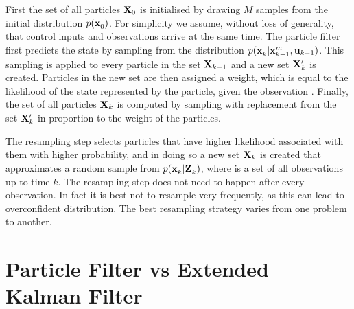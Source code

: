 First the set of all particles ${\bf X}_0$ is initialised by drawing
$M$ samples from the initial distribution $p(\x{0}{}{})$. For
simplicity we assume, without loss of generality, that control
inputs and observations arrive at the same time. The particle filter
first predicts the state by sampling from the distribution
$p(\x{k}{}{} | \x{k-1}{}{m}, \U{k-1})$. This sampling is applied to
every particle in the set ${\bf X}_{k-1}$ and a new set ${\bf
X}_k^\prime$ is created. Particles in the new set are then assigned a
weight, which is equal to the likelihood of the state represented by
the particle, given the observation . Finally, the set of all
particles ${\bf X}_k$ is computed by sampling with replacement from
the set ${\bf X}_k^\prime$ in proportion to the weight of the
particles.

The resampling step selects particles that have higher likelihood
associated with them with higher probability, and in doing so a new
set ${\bf X}_k$ is created that approximates a random sample from
$p(\x{k}{}{}|\Zall{k}{})$, where  is a set of all
observations up to time $k$. The resampling step does not need to
happen after every observation. In fact it is best not to resample
very frequently, as this can lead to overconfident distribution. The
best resampling strategy varies from one problem to
another. 



\section{Particle Filter vs Extended Kalman Filter}
\label{sec:PFvsEKF}

